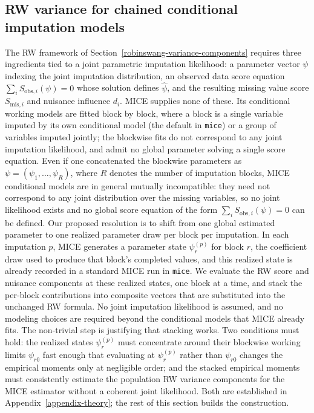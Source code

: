 \subsection{RW variance for chained conditional imputation models}
\label{extension-1}
The RW framework of Section~\ref{robinswang-variance-components} requires
three ingredients
tied to a joint parametric imputation likelihood: a parameter vector
\(\psi\) indexing the joint imputation distribution, an observed data
score equation \(\sum_i S_{\mathrm{obs},i}(\psi)=0\) whose solution
defines \(\hat\psi\), and the resulting missing value score
\(S_{\mathrm{mis},i}\) and nuisance influence \(d_i\).  MICE supplies
none of these.  Its conditional working models are fitted block by
block, where a block is a single variable imputed by its own
conditional model (the default in \texttt{mice}) or a group of
variables imputed jointly; the blockwise fits do not correspond to any
joint imputation likelihood, and admit no global parameter solving a
single score equation.  Even if one concatenated the blockwise
parameters as \(\psi = (\psi_1,\ldots,\psi_R)\), where \(R\) denotes
the number of imputation blocks, MICE conditional models are in
general mutually incompatible: they need not correspond to any joint
distribution over the missing variables, so no joint likelihood exists
and no global score equation of the form
\(\sum_i S_{\mathrm{obs},i}(\psi)=0\) can be defined.
Our proposed resolution is to shift from one global estimated parameter
to one realized parameter draw per block per imputation.  In each
imputation \(p\), MICE generates a parameter state \(\psi_r^{(p)}\) for
block \(r\), the coefficient draw used to produce that block's completed
values, and this realized state is already recorded in a standard MICE
run in \texttt{mice}.  We evaluate the RW score and nuisance components
at these realized states, one block at a time, and stack the per-block
contributions into composite vectors that are substituted into the
unchanged RW formula.  No joint imputation likelihood is assumed, and
no modeling choices are required beyond the conditional models that
MICE already fits.
The non-trivial step is justifying that stacking works.  Two conditions
must hold: the realized states \(\psi_r^{(p)}\) must concentrate around
their blockwise working limits \(\psi_{r0}\) fast enough that evaluating
at \(\psi_r^{(p)}\) rather than \(\psi_{r0}\) changes the empirical
moments only at negligible order; and the stacked empirical moments must
consistently estimate the population RW variance components for the MICE
estimator without a coherent joint likelihood.  Both are established in
Appendix~\ref{appendix-theory}; the rest of this section builds the
construction.

